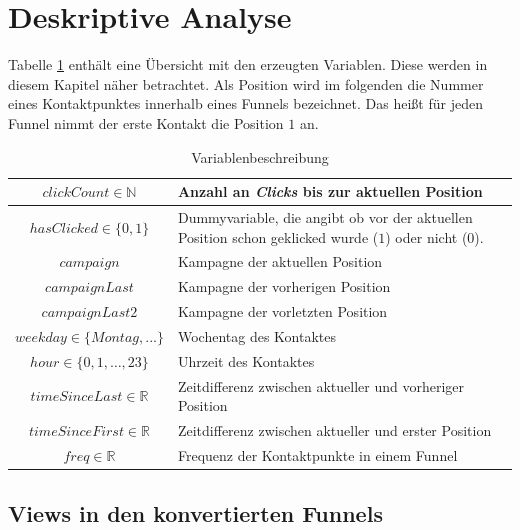 \section{Deskriptive  Analyse}\label{descriptiv}

Tabelle \ref{varbeschreibung} enthält eine Übersicht mit den erzeugten Variablen. Diese werden in diesem Kapitel näher betrachtet. Als Position wird im folgenden die Nummer eines Kontaktpunktes innerhalb eines Funnels bezeichnet. Das heißt für jeden Funnel nimmt der erste Kontakt die Position $1$ an.
\begin{table}[H]
    \begin{center}
\begin{tabular}{|c|p{10cm}|}
		\hline $ clickCount \in \mathbb{N} $ & Anzahl an \textit{Clicks} bis zur aktuellen Position\\
    \hline $ hasClicked\in\{0,1\} $  & Dummyvariable, die angibt ob vor der aktuellen Position schon geklicked wurde ($1$) oder nicht ($0$). \\
		\hline $ campaign $ & Kampagne der aktuellen Position\\ 
    \hline $ campaignLast $ & Kampagne der vorherigen Position\\ 
    \hline $ campaignLast2 $  & Kampagne der vorletzten Position\\
    \hline $ weekday \in \{Montag,...\}$ & Wochentag des Kontaktes  \\
    \hline $ hour \in \{0,1,\dots, 23\} $  & Uhrzeit des Kontaktes \\
    \hline $ timeSinceLast \in \mathbb{R}$  & Zeitdifferenz zwischen aktueller und vorheriger Position\\
    \hline $ timeSinceFirst \in \mathbb{R} $ & Zeitdifferenz zwischen aktueller und erster Position\\
    \hline$ freq \in \mathbb{R} $ & Frequenz der Kontaktpunkte in einem Funnel\\
    \hline
\end{tabular} 
 \end{center}
 \caption{Variablenbeschreibung}\label{varbeschreibung}
\end{table}

\subsection{Views in den konvertierten Funnels}\label{plotsViews}


